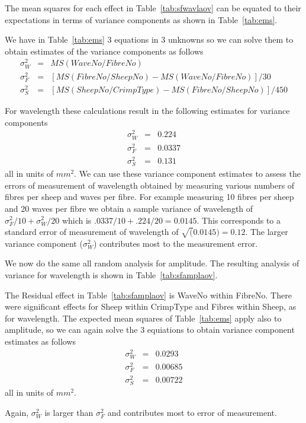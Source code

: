 \documentclass[titlepage,10pt]{article}  %
\begin{document}
The mean squares for each effect in Table~\ref{tab:sfwavlaov} can be equated to their expectations in terms of variance components as shown in Table~\ref{tab:ems}.

We have in Table~\ref{tab:ems} 3 equations in 3 unknowns so we can solve them to obtain estimates of the variance components as follows
\begin{eqnarray*}
\sigma^{2}_{W} & = & MS(WaveNo/FibreNo) \\
\sigma^{2}_{F} & = & [MS(FibreNo/SheepNo) - MS(WaveNo/FibreNo)]/30 \\
\sigma^{2}_{S} & = & [MS(SheepNo/CrimpType) - MS(FibreNo/SheepNo)]/450 
\end{eqnarray*}

For wavelength these calculations result in the following estimates for variance components
\begin{eqnarray*}
\sigma^{2}_{W} & = & 0.224 \\
\sigma^{2}_{F} & = & 0.0337 \\
\sigma^{2}_{S} & = & 0.131
\end{eqnarray*}
all in units of $mm^{2}$.
We can use these variance component estimates to assess the errors of measurement of wavelength obtained by measuring various numbers of fibres per sheep and waves per fibre. For example measuring 10 fibres per sheep and 20 waves per fibre we obtain a sample variance of wavelength of $\sigma^{2}_{F}/10 + \sigma^{2}_{W}/20$ which is $.0337/10 + .224/20 = 0.0145$.
This corresponds to a standard error of measurement of wavelength of $\sqrt(0.0145 ) = 0.12$.
The larger variance component ($\sigma^{2}_{W}$) contributes most to the measurement error.

We now do the same all random analysis for amplitude. The resulting  analysis of variance for wavelength is shown in Table~\ref{tab:sfamplaov}.

The Residual effect in Table~\ref{tab:sfamplaov} is WaveNo within FibreNo.
There were significant effects for  Sheep within CrimpType  and Fibres within Sheep, as for wavelength. 
The expected mean squares of Table~\ref{tab:ems} apply also to amplitude, so we can again solve the 3 equiations to obtain variance component estimates as follows
\begin{eqnarray*}
\sigma^{2}_{W} & = & 0.0293 \\
\sigma^{2}_{F} & = & 0.00685 \\
\sigma^{2}_{S} & = & 0.00722
\end{eqnarray*}
all in units of $mm^{2}$.

Again, $\sigma^{2}_{W}$ is larger than $\sigma^{2}_{F}$ and contributes most to error of measurement.
\end{document}
